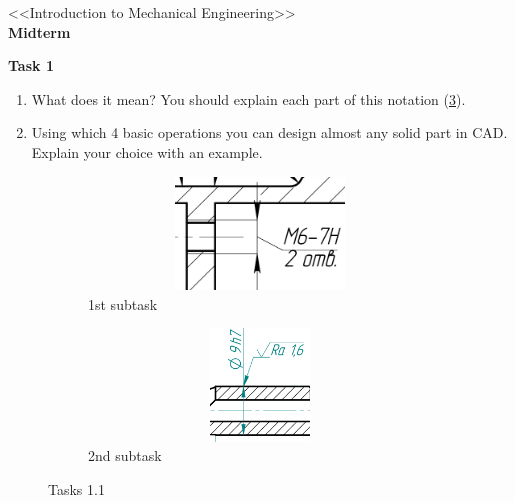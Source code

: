 \documentclass[12pt]{article}
\newcommand\pic[1]{(\cref{#1})} %
\begin{document}
\begin{center}
    \LARGE <<Introduction to Mechanical Engineering>> \\ \textbf{Midterm}
\end{center}

\textbf{Task 1}
\begin{enumerate}
    \item What does it mean? You should explain each part of this notation \pic{fig:task11}.
    \item Using which 4 basic operations you can design almost any solid part in CAD. Explain your choice with an example.
\end{enumerate}
\begin{figure}[H]
    \begin{subfigure}{0.49\textwidth}
        \centering\includegraphics[height=3cm,width=1\textwidth,keepaspectratio]{resources_quiz_1/quiz1_task1.png}
        \caption{1st subtask}
        \label{fig:resources_quiz_1/quiz1_task1.png}
    \end{subfigure}
    \begin{subfigure}{0.49\textwidth}
        \centering\includegraphics[height=3cm,width=1\textwidth,keepaspectratio]{resources_quiz_1/quiz1_task12.png}
        \caption{2nd subtask}
        \label{fig:resources_quiz_1/quiz1_task12.png}
    \end{subfigure}
\caption{Tasks 1.1}
\label{fig:task11}
\end{figure}
\end{document}
